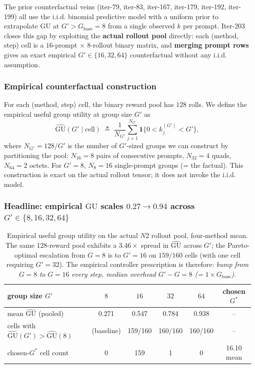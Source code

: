 \label{sec:p7-iter203-empirical-gprime}

The prior counterfactual veins (iter-79, iter-83, iter-167, iter-179, iter-192,
iter-199) all use the i.i.d. binomial predictive model with a uniform prior
to extrapolate $\mathrm{GU}$ at $G' > G_{\text{base}} = 8$ from a single observed
$k$ per prompt.  Iter-203 closes this gap by exploiting the \textbf{actual
rollout pool} directly: each (method, step) cell is a $16$-prompt $\times$
$8$-rollout binary matrix, and \textbf{merging prompt rows} gives an exact
empirical $G' \in \{16, 32, 64\}$ counterfactual without any i.i.d.
assumption.

\subsubsection*{Empirical counterfactual construction}

For each (method, step) cell, the binary reward pool has $128$ rolls.  We
define the empirical useful group utility at group size $G'$ as
\[
\widehat{\mathrm{GU}}(G' \;|\; \text{cell}) \;\triangleq\;
\frac{1}{N_{G'}}\sum_{j=1}^{N_{G'}}\mathbf{1}\{0 < k_j^{(G')} < G'\},
\]
where $N_{G'} = 128 / G'$ is the number of $G'$-sized groups we can construct
by partitioning the pool: $N_{16}=8$ pairs of consecutive prompts, $N_{32}=4$
quads, $N_{64}=2$ octets.  For $G'=8$, $N_8=16$ single-prompt groups (= the
factual).  This construction is exact on the actual rollout tensor; it does
not invoke the i.i.d. model.

\subsubsection*{Headline: empirical $\mathrm{GU}$ scales $0.27 \to 0.94$ across $G' \in \{8, 16, 32, 64\}$}

\begin{table}[h]
\centering
\small
\begin{tabular}{l|cccc|c}
\toprule
group size $G'$ & $8$ & $16$ & $32$ & $64$ & chosen $G^*$ \\
\midrule
mean $\widehat{\mathrm{GU}}$ (pooled) & 0.271 & 0.547 & 0.784 & 0.938 & -- \\
cells with $\widehat{\mathrm{GU}}(G') > \widehat{\mathrm{GU}}(8)$ & (baseline) & 159/160 & 160/160 & 160/160 & -- \\
chosen-$G^*$ cell count & 0 & 159 & 1 & 0 & 16.10 mean \\
\bottomrule
\end{tabular}
\caption{Empirical useful group utility on the actual $N2$ rollout pool, four-method
mean.  The same $128$-reward pool exhibits a $3.46\times$ spread in
$\widehat{\mathrm{GU}}$ across $G'$; the Pareto-optimal escalation from $G=8$ is to
$G'=16$ on $159/160$ cells (with one cell requiring $G'=32$).  The empirical
controller prescription is therefore: \textit{bump from $G=8$ to $G=16$ every
step, median overhead $G' - G = 8$ (= $1\times G_{\text{base}}$)}.}
\label{tab:p7-iter203-empirical-gu}
\end{table}

